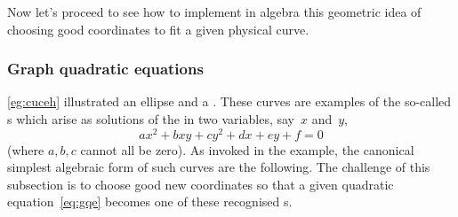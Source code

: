 Now let's proceed to see how to implement in algebra this geometric idea of choosing good coordinates to fit a given physical curve. 


\subsubsection{Graph quadratic equations}
\label{sec:gqe}

\autoref{eg:cuceh} illustrated an ellipse and a .  These curves are examples of the so-called s which arise as solutions of the  in two variables, say~\(x\) and~\(y\),
\begin{equation}
ax^2+bxy+cy^2+dx+ey+f=0 \label{eq:gqe}
\end{equation}
(where \(a,b,c\) cannot all be zero).
As invoked in the example, the canonical simplest algebraic form of such curves are the following.
The challenge of this subsection is to choose good new coordinates so that a given quadratic equation~\eqref{eq:gqe} becomes one of these recognised s.
